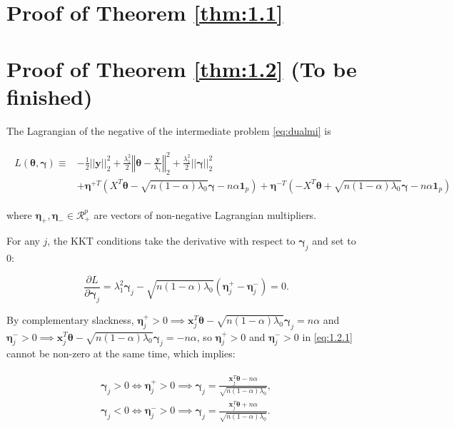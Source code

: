 \section{Proof of Theorem \ref{thm:1.1}}

\section{Proof of Theorem \ref{thm:1.2} (To be finished)}

The Lagrangian of the negative of the intermediate problem \eqref{eq:dualmi} is

\begin{gather}
    \begin{aligned}
        L(\boldsymbol\theta,\boldsymbol\gamma)\equiv&-\frac{1}{2}||\boldsymbol y||_2^2+\frac{\lambda_1^2}{2}\left\Vert\boldsymbol\theta-\frac{\boldsymbol y}{\lambda_1}\right\Vert_2^2+\frac{\lambda_1^2}{2}||\boldsymbol\gamma||_2^2\\
        &+\boldsymbol\eta^{+T}(X^T\boldsymbol\theta-\sqrt{n(1-\alpha)\lambda_0}\boldsymbol\gamma-n\alpha\mathbf{1}_p)+\boldsymbol\eta^{-T}(-X^T\boldsymbol\theta+\sqrt{n(1-\alpha)\lambda_0}\boldsymbol\gamma-n\alpha\mathbf{1}_p)
    \end{aligned}
\end{gather}

where $\boldsymbol\eta_+,\boldsymbol\eta_-\in \mathcal{R}^p_+$ are vectors of non-negative Lagrangian multipliers.

For any $j$, the KKT conditions take the derivative with respect to $\boldsymbol\gamma_j$ and set to 0:

\begin{equation}
    \label{eq:1.2.1}
    \frac{\partial L}{\partial \boldsymbol\gamma_j}=\lambda_1^2\boldsymbol\gamma_j-\sqrt{n(1-\alpha)\lambda_0}(\boldsymbol\eta_j^+-\boldsymbol\eta_j^-)=0.
\end{equation}

By complementary slackness, $\boldsymbol\eta_j^+>0\implies \boldsymbol x_j^T\boldsymbol\theta-\sqrt{n(1-\alpha)\lambda_0}\boldsymbol\gamma_j=n\alpha$ and $\boldsymbol\eta_j^->0\implies \boldsymbol x_j^T\boldsymbol\theta-\sqrt{n(1-\alpha)\lambda_0}\boldsymbol\gamma_j=-n\alpha$, so $\boldsymbol\eta_j^+>0$ and $\boldsymbol\eta_j^->0$ in \eqref{eq:1.2.1} cannot be non-zero at the same time, which implies:

\begin{gather}
    \begin{aligned}
        \boldsymbol\gamma_j>0\iff\boldsymbol\eta_j^+>0\implies \boldsymbol\gamma_j=\frac{\boldsymbol x_j^T\boldsymbol\theta-n\alpha}{\sqrt{n(1-\alpha)\lambda_0}},\\
        \boldsymbol\gamma_j<0\iff\boldsymbol\eta_j^->0\implies \boldsymbol\gamma_j=\frac{\boldsymbol x_j^T\boldsymbol\theta+n\alpha}{\sqrt{n(1-\alpha)\lambda_0}}.
    \end{aligned}
\end{gather}

